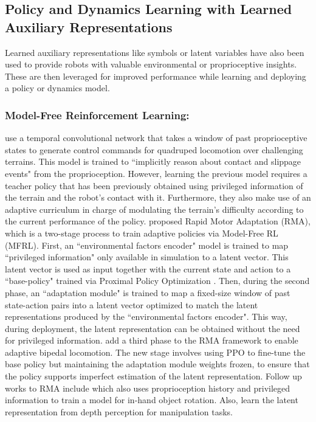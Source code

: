 \documentclass[Afour,sageh,times]{sagej}
\theoremstyle{lemma}
\begin{document}
\subsection{Policy and Dynamics Learning with Learned Auxiliary Representations} \label{sec:related-work-auxreps}

Learned auxiliary representations like symbols or latent variables have also been used to provide robots with valuable environmental or proprioceptive insights. These are then leveraged for improved performance while learning and deploying a policy or dynamics model.

\subsubsection{Model-Free Reinforcement Learning:} 

\cite{lee2020learning} use a temporal convolutional network that takes a window of past proprioceptive states to generate control commands for quadruped locomotion over challenging terrains. This model is trained to ``implicitly reason about contact and slippage events" from the proprioception. However, learning the previous model requires a teacher policy that has been previously obtained using privileged information of the terrain and the robot's contact with it. Furthermore, they also make use of an adaptive curriculum in charge of modulating the terrain's difficulty according to the current performance of the policy.    \cite{kumar2021rma} proposed Rapid Motor Adaptation (RMA), which is a two-stage process to train adaptive policies via Model-Free RL (MFRL). First, an ``environmental factors encoder" model is trained to map ``privileged information" only available in simulation to a latent vector. This latent vector is used as input together with the current state and action to a ``base-policy" trained via Proximal Policy Optimization \cite[PPO]{schulman2017proximal}. Then, during the second phase, an ``adaptation module" is trained to map a fixed-size window of past state-action pairs into a latent vector optimized to match the latent representations produced by the ``environmental factors encoder". This way, during deployment, the latent representation can be obtained without the need for privileged information. \cite{kumar2022adapting} add a third phase to the RMA framework to enable adaptive bipedal locomotion. The new stage involves using PPO to fine-tune the base policy but maintaining the adaptation module weights frozen, to ensure that the policy supports imperfect estimation of the latent representation. Follow up works to RMA include \cite{qi2023hand} which also uses proprioception history and privileged information to train a model for in-hand object rotation. Also, \cite{liang2024rapid} learn the latent representation from depth perception for manipulation tasks.
\end{document}
